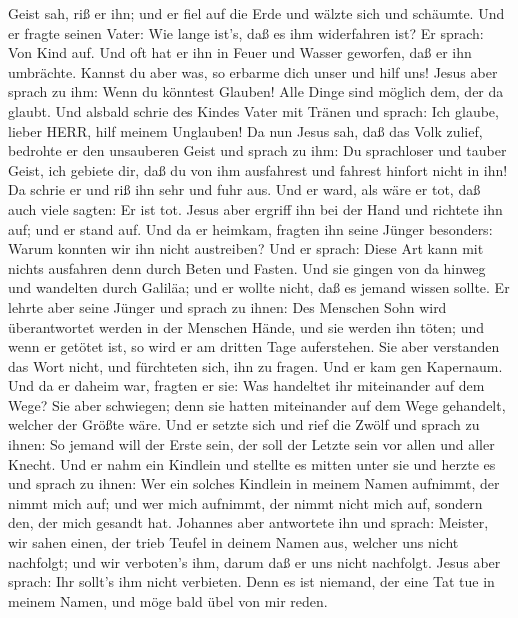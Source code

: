 Geist sah, riß er ihn; und er fiel auf die Erde und wälzte sich und
schäumte.  Und er fragte seinen Vater: Wie lange ist's, daß
es ihm widerfahren ist? Er sprach: Von Kind auf.  Und oft
hat er ihn in Feuer und Wasser geworfen, daß er ihn umbrächte. Kannst du
aber was, so erbarme dich unser und hilf uns!  Jesus aber
sprach zu ihm: Wenn du könntest Glauben! Alle Dinge sind möglich dem,
der da glaubt.  Und alsbald schrie des Kindes Vater mit
Tränen und sprach: Ich glaube, lieber HERR, hilf meinem Unglauben!
 Da nun Jesus sah, daß das Volk zulief, bedrohte er den
unsauberen Geist und sprach zu ihm: Du sprachloser und tauber Geist, ich
gebiete dir, daß du von ihm ausfahrest und fahrest hinfort nicht in ihn!
 Da schrie er und riß ihn sehr und fuhr aus. Und er ward,
als wäre er tot, daß auch viele sagten: Er ist tot.  Jesus
aber ergriff ihn bei der Hand und richtete ihn auf; und er stand auf.
 Und da er heimkam, fragten ihn seine Jünger besonders:
Warum konnten wir ihn nicht austreiben?  Und er sprach:
Diese Art kann mit nichts ausfahren denn durch Beten und Fasten.
 Und sie gingen von da hinweg und wandelten durch Galiläa;
und er wollte nicht, daß es jemand wissen sollte.  Er
lehrte aber seine Jünger und sprach zu ihnen: Des Menschen Sohn wird
überantwortet werden in der Menschen Hände, und sie werden ihn töten;
und wenn er getötet ist, so wird er am dritten Tage auferstehen.
 Sie aber verstanden das Wort nicht, und fürchteten sich,
ihn zu fragen.  Und er kam gen Kapernaum. Und da er daheim
war, fragten er sie: Was handeltet ihr miteinander auf dem Wege?
 Sie aber schwiegen; denn sie hatten miteinander auf dem
Wege gehandelt, welcher der Größte wäre.  Und er setzte
sich und rief die Zwölf und sprach zu ihnen: So jemand will der Erste
sein, der soll der Letzte sein vor allen und aller Knecht. 
Und er nahm ein Kindlein und stellte es mitten unter sie und herzte es
und sprach zu ihnen:  Wer ein solches Kindlein in meinem
Namen aufnimmt, der nimmt mich auf; und wer mich aufnimmt, der nimmt
nicht mich auf, sondern den, der mich gesandt hat. 
Johannes aber antwortete ihn und sprach: Meister, wir sahen einen, der
trieb Teufel in deinem Namen aus, welcher uns nicht nachfolgt; und wir
verboten's ihm, darum daß er uns nicht nachfolgt.  Jesus
aber sprach: Ihr sollt's ihm nicht verbieten. Denn es ist niemand, der
eine Tat tue in meinem Namen, und möge bald übel von mir reden.
